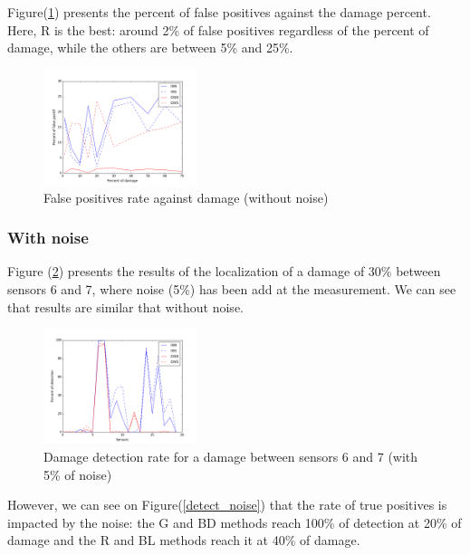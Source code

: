 \documentclass[journal]{IEEEtran}
\begin{document}
Figure(\ref{fp}) presents the percent of false positives against the damage percent. Here, R is the best: around 2\% of false positives regardless of the percent of damage, while the others are between 5\% and 25\%.


\begin{figure}[h!]
  \centering
  \includegraphics[width=0.4\textwidth]{images/fp.png}
  \caption{False positives rate against damage (without noise)}
  \label{fp}
\end{figure}



\subsubsection{With noise}



Figure (\ref{damage30noise}) presents the results of the localization of a damage of 30\% between sensors 6 and 7, where noise (5\%) has been add at the measurement. We can see that results are similar that without noise.


\begin{figure}[h!]
  \centering
  \includegraphics[width=0.4\textwidth]{images/damage30percent004noise.png}
  \caption{Damage detection rate for a damage between sensors 6 and 7 (with 5\% of noise)}
  \label{damage30noise}
\end{figure}

However, we can see on Figure(\ref{detect_noise}) that the rate of true positives is impacted by the noise: the G and BD methods reach 100\% of detection at 20\% of damage and the R and BL methods reach it at 40\% of damage.
\end{document}
